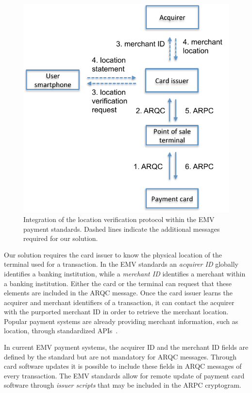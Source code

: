 \begin{figure}[!ht]
    \centering
    \includegraphics[width=0.7\linewidth]{figures/phonesecures/tee_integration}
    \caption[Integration of the location verification protocol within the EMV
    payment standards]{Integration of the location verification protocol
    within the EMV payment standards. Dashed lines indicate the additional
    messages required for our solution.}
    \label{fig:ps_tee_payment}
\end{figure}

Our solution requires the card issuer to know the physical location of the
terminal used for a transaction. In the EMV standards an \emph{acquirer ID}
globally identifies a banking institution, while a \emph{merchant ID}
identifies a merchant within a banking institution. Either the card or the
terminal can request that these elements are included in the ARQC message. Once
the card issuer learns the acquirer and merchant identifiers of a transaction,
it can contact the acquirer with the purported merchant ID in order to retrieve
the merchant location. Popular payment systems are already providing merchant
information, such as location, through standardized
APIs~\cite{mastercarddev,visadev}.

In current EMV payment systems, the acquirer ID and the merchant ID fields are
defined by the standard but are not mandatory for ARQC messages.  Through card
software updates it is possible to include these fields in ARQC messages of
every transaction.  The EMV standards allow for remote update of payment card
software through \emph{issuer scripts} that may be included in the ARPC
cryptogram.

